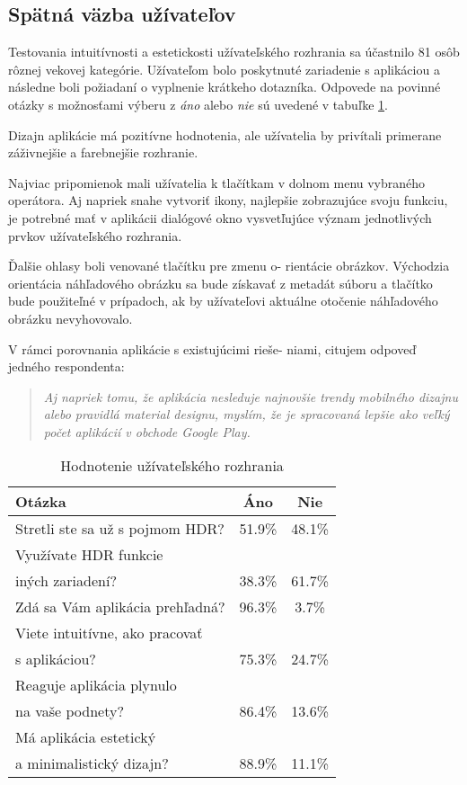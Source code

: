 \documentclass[slovak]{ExcelAtFIT}
\begin{document}
\subsection{Spätná väzba užívateľov}
\label{sec:Result-Feedback}

Testovania intuitívnosti a estetickosti užívateľského rozhrania sa účastnilo 81 osôb rôznej vekovej kategórie. Užívateľom
bolo poskytnuté zariadenie s aplikáciou a následne boli požiadaní o vyplnenie krátkeho dotazníka. Odpovede na povinné otázky
s možnosťami výberu z \textit{áno} alebo \textit{nie} sú uvedené v tabuľke \ref{tab:FeedbackTable}.

Dizajn aplikácie má pozitívne hodnotenia, ale užívatelia by privítali primerane záživnejšie a farebnejšie rozhranie.

Najviac pripomienok mali užívatelia k tlačítkam v dolnom menu vybraného operátora. Aj napriek snahe vytvoriť ikony,
najlepšie zobrazujúce svoju funkciu, je potrebné mať v aplikácii dialógové okno vysvetľujúce význam jednotlivých
prvkov užívateľského rozhrania.

Ďalšie ohlasy boli venované tlačítku pre zmenu o- rientácie obrázkov. Východzia orientácia náhľadového obrázku sa bude získavať
z metadát súboru a tlačítko bude použiteľné v prípadoch, ak by užívateľovi aktuálne otočenie náhľadového obrázku nevyhovovalo.

V rámci porovnania aplikácie s existujúcimi rieše- niami, citujem odpoveď jedného respondenta:
\begin{quote}
	\textit{Aj napriek tomu, že aplikácia nesleduje najnovšie trendy mobilného dizajnu alebo pravidlá material
	designu, myslím, že je spracovaná lepšie ako veľký počet aplikácií v obchode Google Play.}
\end{quote}

\begin{table}[t]
	\vskip6pt
	\caption{Hodnotenie užívateľského rozhrania}
	\centering
	\begin{tabular}{l c c}
		\toprule
		Otázka & Áno & Nie \\
		\midrule
		Stretli ste sa už s pojmom HDR? & 51.9\% & 48.1\% \\
		Využívate HDR funkcie \\iných zariadení? & 38.3\% & 61.7\% \\
		Zdá sa Vám aplikácia prehľadná? & 96.3\% & 3.7\% \\
		Viete intuitívne, ako pracovať\\s aplikáciou? & 75.3\% & 24.7\% \\
		Reaguje aplikácia plynulo \\na vaše podnety? & 86.4\% & 13.6\% \\
		Má aplikácia estetický \\a minimalistický dizajn? & 88.9\% & 11.1\% \\
		\bottomrule
	\end{tabular}
	\label{tab:FeedbackTable}
\end{table}
\end{document}
